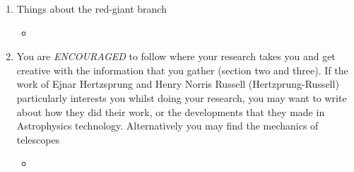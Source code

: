 \documentclass{article}
\newenvironment{white}{\color{white}}{\ignorespacesafterend}
\begin{document}
    \begin{tcolorbox}[enhanced,attach boxed title to top center={yshift=-3mm,yshifttext=-1mm},colback=black!90!white,colframe=black!80!white,colbacktitle=black!80!black,title=Activity 3 - Stellar Research,fonttitle=\bfseries,boxed title style={size=small,colframe=black!80!black}]
        \begin{bfseries}
        \begin{white}
            \begin{enumerate}

                \item Things about the red-giant branch
                    \begin{itemize}
                        \item 
                    \end{itemize}

                \item You are \emph{ENCOURAGED} to follow where your research takes you and get creative with the information that you gather (section two and three). If the work of Ejnar Hertzsprung and Henry Norris Russell (Hertzprung-Russell) particularly interests you whilst doing your research, you may want to write about how they did their work, or the developments that they made in Astrophysics technology. Alternatively you may find the mechanics of telescopes
                    \begin{itemize}
                        \item 
                    \end{itemize}
                    
            \end{enumerate}
        \end{white}
        \end{bfseries}
    \end{tcolorbox}
\end{document}
